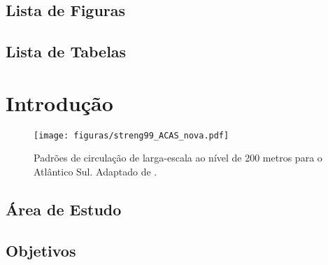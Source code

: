\documentclass[12pt,portuguese,a4paper,pdftex]{article}
\renewcommand{\baselinestretch}{1.5}
\begin{document}
\newpage
\tableofcontents

\newpage
\pagestyle{plain}

\begin{center}
\section*{Lista de Figuras}
\end{center}
\listoffigures

\newpage
\pagestyle{plain}

\begin{center}
\section*{Lista de Tabelas}
\end{center}
\listoftables

\newpage
{}
\renewcommand{\baselinestretch}{1}

\pagestyle{plain}
\setcounter{page}{1}

\section{Introdução}

\vspace{-0.5cm}

\begin{figure}[ht]
\begin{center}
\texttt{[image: figuras/streng99\_ACAS\_nova.pdf]}
\end{center}
\vspace{-0.5cm}
\renewcommand{\baselinestretch}{.5}
\caption{\label{fig:streng2} \small{Padr\~oes de circula\c c\~ao de larga-escala ao n\'ivel de 200 metros para o Atl\^antico Sul. 
Adaptado de \cite{stramma_england1999}.}}
\end{figure}


    \subsection{Área de Estudo}
    \subsection{Objetivos}
\end{document}
